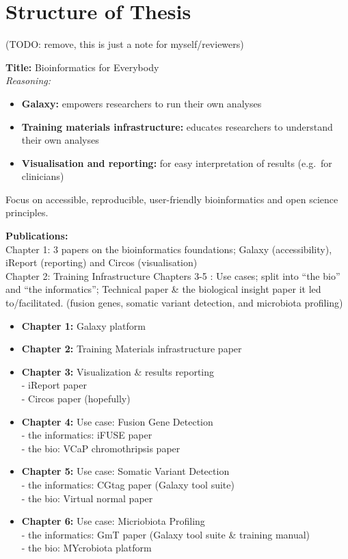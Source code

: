 \chapter*{Structure of Thesis}
\vspace{-2cm}
(TODO: remove, this is just a note for myself/reviewers)


\textbf{Title: } Bioinformatics for Everybody \\
\textit{Reasoning: }\vspace{-1.8em}
\begin{itemize}
\itemsep-0.5em
  \item \textbf{Galaxy:} empowers researchers to run their own analyses
  \item \textbf{Training materials infrastructure:} educates researchers to understand their own analyses
  \item \textbf{Visualisation and reporting:} for easy interpretation of results (e.g.\ for clinicians)
\end{itemize}
\vspace{-1.8em}
Focus on accessible, reproducible, user-friendly bioinformatics and open science principles.


\textbf{Publications:} \\

Chapter 1: 3 papers on the bioinformatics foundations; Galaxy (accessibility), iReport (reporting) and Circos (visualisation) \\
Chapter 2: Training Infrastructure
Chapters 3-5 : Use cases; split into ``the bio'' and ``the informatics''; Technical paper \& the biological insight paper it led to/facilitated. (fusion genes, somatic variant detection, and microbiota profiling) \\

\begin{itemize}
\itemsep-0.5em
\item \textbf{Chapter 1:} Galaxy platform \\
\item \textbf{Chapter 2:} Training Materials infrastructure paper \\
\item \textbf{Chapter 3:} Visualization \& results reporting \\
  - iReport paper \\
  - Circos paper (hopefully)
\item \textbf{Chapter 4:} Use case: Fusion Gene Detection \\
  - the informatics: iFUSE paper \\
  - the bio: VCaP chromothripsis paper
\item \textbf{Chapter 5:} Use case: Somatic Variant Detection \\
  - the informatics: CGtag paper (Galaxy tool suite) \\
  - the bio: Virtual normal paper
\item \textbf{Chapter 6:} Use case: Micriobiota Profiling \\
  - the informatics: GmT paper (Galaxy tool suite \& training manual) \\
  - the bio: MYcrobiota platform
\end{itemize}

